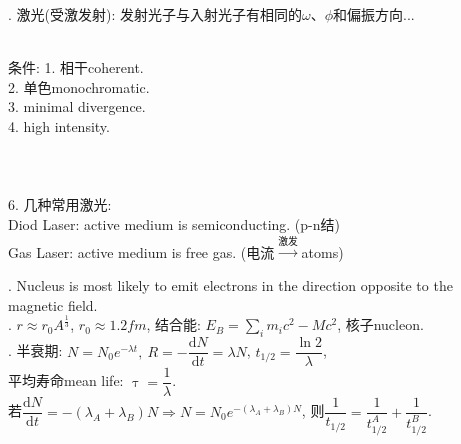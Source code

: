 \documentclass[12pt, 
]{article}
\begin{document}
. 激光(受激发射): 发射光子与入射光子有相同的$\omega$、$\phi$和偏振方向...

\begin{figure}
\hspace{-2cm}
\label{fg:17}
\end{figure}
\vspace{-0.6cm}
~\\\phantom{~~~~}条件: 1. 相干coherent.
~\\\phantom{~~~~条件:~}2. 单色monochromatic.
~\\\phantom{~~~~条件:~}3. minimal divergence.
~\\\phantom{~~~~条件:~}4. high intensity.
~\\~\\~\\~\\\phantom{~~}6. 几种常用激光: 
~\\\phantom{~~~~~~~~}Diod Laser: active medium is semiconducting. (p-n结)
~\\\phantom{~~~~~~~~}Gas Laser: active medium is free gas. (电流$\stackrel{\text{激发}}{\longrightarrow}$atoms)
~\\

. Nucleus is most likely to emit electrons in the direction opposite to the magnetic field.
~\\

. $r\approx r_0A^{\frac{1}{3}}$, $r_0\approx 1.2 fm$, 结合能: $E_B=\displaystyle\sum_i m_i c^2-Mc^2$, 核子nucleon.
~\\

. 半衰期: $N=N_0e^{-\lambda t},~R=-\dfrac{\mathrm{d}N}{\mathrm{d}t}=\lambda N$, $t_{1/2}=\dfrac{\ln 2}{\lambda}$,
~\\\phantom{~~~~}平均寿命mean life: $\uptau=\dfrac{1}{\lambda}$.
~\\\phantom{~~~~}若$\dfrac{\mathrm{d}N}{\mathrm{d}t}=-(\lambda_A+\lambda_B)N\Rightarrow N=N_0e^{-(\lambda_A+\lambda_B)N}$, 则$\dfrac{1}{t_{1/2}}=\dfrac{1}{t_{1/2}^A}+\dfrac{1}{t_{1/2}^B}$.
~\\
\end{document}
